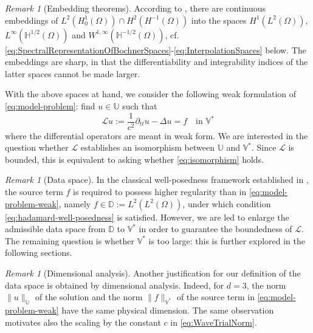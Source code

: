 \documentclass{amsart}
\theoremstyle{plain}
\theoremstyle{remark}
\newtheorem{remark}[theorem]{Remark}
\numberwithin{equation}{section}
\numberwithin{theorem}{section}
\newcommand{\trial}{\mathbb{U}}
\newcommand{\data}{\mathbb{V}^*}
\begin{document}
\begin{remark}[Embedding theorems]
\label{rem:embedding-theorem}
According to \cite[Theorems 2.3, 3.1]{Lions.Magenes:72}, there are continuous embeddings of $L^2(H^1_0(\Omega)) \cap H^2(H^{-1}(\Omega))$ into the spaces $H^1(L^2(\Omega))$, $L^\infty(\mathbb H^{1/2}(\Omega))$ and $W^{1,\infty}(\mathbb H^{-1/2}(\Omega))$, cf. \eqref{eq:SpectralRepresentationOfBochnerSpaces}-\eqref{eq:InterpolationSpaces} below. The embeddings are sharp, in that the differentiability and integrability indices of the latter spaces cannot be made larger.
\end{remark}

With the above spaces at hand, we consider the following weak formulation of \eqref{eq:model-problem}: find $u \in \trial$ such that
\begin{equation}
\label{eq:model-problem-weak}
\mathcal{L} u := \frac{1}{c^2}\partial_{tt} u - \Delta u = f \quad \text{in $\data$}
\end{equation}
where the differential operators are meant in weak form. We are interested in the question whether $\mathcal{L}$ establishes an isomorphism between $\trial$ and $\data$. Since $\mathcal{L}$ is bounded, this is equivalent to asking whether \eqref{eq:isomorphism} holds.

\begin{remark}[Data space]
\label{rem:data-space}
In the classical well-posedness framework established in \cite{Dautray.Lions:92, Evans:10, Ladyzhenskaya:85, Lions.Magenes:72}, the source term $f$ is required to possess higher regularity than in \eqref{eq:model-problem-weak}, namely $f \in \mathbb D := L^2(L^2(\Omega))$, under which condition \eqref{eq:hadamard-well-posedness} is satisfied. However, we are  led to enlarge the admissible data space from $\mathbb D$ to $\data$ in order to guarantee the boundedness of $\mathcal{L}$. The remaining question is whether $\data$ is too large: this is further explored in the following sections.
\end{remark}

\begin{remark}[Dimensional analysis]
\label{rem:dimensional-analysis}
Another justification for our definition of the data space is obtained by dimensional analysis. Indeed, for $d = 3$, the norm $\|u\|_\trial$ of the solution and the norm $\|f\|_{\data}$ of the source term in \eqref{eq:model-problem-weak} have the same physical dimension.  The same observation motivates also the scaling by the constant $c$ in \eqref{eq:WaveTrialNorm}.
\end{remark}
\end{document}
